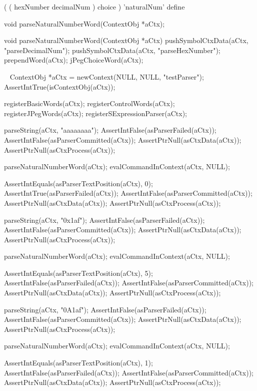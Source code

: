\startTestSuite[parseNaturalNumberWord]

\starttyping
(
  ( hexNumber decimalNum ) choice
) 'naturalNum' define
\stoptyping

\startCHeader
void parseNaturalNumberWord(ContextObj *aCtx);
\stopCHeader

\startCCode
void parseNaturalNumberWord(ContextObj *aCtx) {
  pushSymbolCtxData(aCtx, "parseDecimalNum");
  pushSymbolCtxData(aCtx, "parseHexNumber");
  prependWord(aCtx);
  jPegChoiceWord(aCtx);
}
\stopCCode

\CTestsSuiteSetup\
\startCTest
  ContextObj *aCtx = newContext(NULL, NULL, "testParser");
  AssertIntTrue(isContextObj(aCtx));
  
  registerBasicWords(aCtx);
  registerControlWords(aCtx);
  registerJPegWords(aCtx);
  registerSExpressionParser(aCtx);
\stopCTest

\startCTest
  parseString(aCtx, "aaaaaaaa");
  AssertIntFalse(asParserFailed(aCtx));
  AssertIntFalse(asParserCommitted(aCtx));
  AssertPtrNull(asCtxData(aCtx));
  AssertPtrNull(asCtxProcess(aCtx));
  
  parseNaturalNumberWord(aCtx);
  evalCommandInContext(aCtx, NULL);
  
  AssertIntEquals(asParserTextPosition(aCtx), 0);
  AssertIntTrue(asParserFailed(aCtx));
  AssertIntFalse(asParserCommitted(aCtx));
  AssertPtrNull(asCtxData(aCtx));
  AssertPtrNull(asCtxProcess(aCtx));
\stopCTest
\stopTestCase

\startCTest
  parseString(aCtx, "0x1af");
  AssertIntFalse(asParserFailed(aCtx));
  AssertIntFalse(asParserCommitted(aCtx));
  AssertPtrNull(asCtxData(aCtx));
  AssertPtrNull(asCtxProcess(aCtx));
  
  parseNaturalNumberWord(aCtx);
  evalCommandInContext(aCtx, NULL);
  
  AssertIntEquals(asParserTextPosition(aCtx), 5);
  AssertIntFalse(asParserFailed(aCtx));
  AssertIntFalse(asParserCommitted(aCtx));
  AssertPtrNull(asCtxData(aCtx));
  AssertPtrNull(asCtxProcess(aCtx));
  
  parseString(aCtx, "0A1af");
  AssertIntFalse(asParserFailed(aCtx));
  AssertIntFalse(asParserCommitted(aCtx));
  AssertPtrNull(asCtxData(aCtx));
  AssertPtrNull(asCtxProcess(aCtx));
  
  parseNaturalNumberWord(aCtx);
  evalCommandInContext(aCtx, NULL);
  
  AssertIntEquals(asParserTextPosition(aCtx), 1);
  AssertIntFalse(asParserFailed(aCtx));
  AssertIntFalse(asParserCommitted(aCtx));
  AssertPtrNull(asCtxData(aCtx));
  AssertPtrNull(asCtxProcess(aCtx));
  
